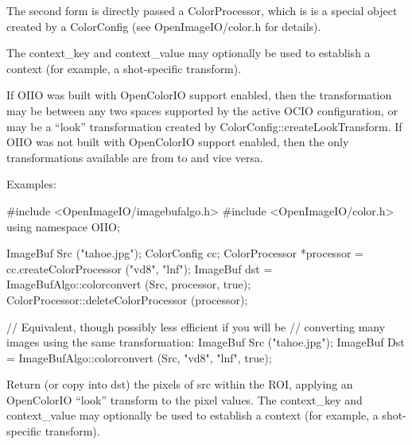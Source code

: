 The second form is directly passed a {\cf ColorProcessor}, which is is a
special object created by a {\cf ColorConfig} (see {\cf OpenImageIO/color.h}
for details).

The {\cf context_key} and {\cf context_value} may optionally be used
to establish a context (for example, a shot-specific transform).

If OIIO was built with OpenColorIO support enabled, then the transformation
may be between any two spaces supported by the active OCIO configuration, or
may be a ``look'' transformation created by {\cf
ColorConfig::createLookTransform}.  If OIIO was not built with OpenColorIO
support enabled, then the only transformations available are from 
to  and vice versa.

\smallskip
\noindent Examples:
\begin{code}
    #include <OpenImageIO/imagebufalgo.h>
    #include <OpenImageIO/color.h>
    using namespace OIIO;

    ImageBuf Src ("tahoe.jpg");
    ColorConfig cc;
    ColorProcessor *processor = cc.createColorProcessor ("vd8", "lnf");
    ImageBuf dst = ImageBufAlgo::colorconvert (Src, processor, true);
    ColorProcessor::deleteColorProcessor (processor);

    // Equivalent, though possibly less efficient if you will be
    // converting many images using the same transformation:
    ImageBuf Src ("tahoe.jpg");
    ImageBuf Dst = ImageBufAlgo::colorconvert (Src, "vd8", "lnf", true);
\end{code}
\apiend

 
Return (or copy into {\cf dst}) the pixels of {\cf src} within the ROI,
applying an OpenColorIO ``look'' transform to the pixel values.
The {\cf context_key} and {\cf context_value} may optionally be used
to establish a context (for example, a shot-specific transform).

